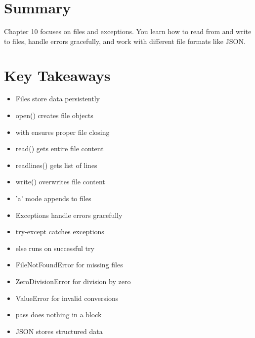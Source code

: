 \section*{Summary}
Chapter 10 focuses on files and exceptions. You learn how to read from and write to files, handle errors gracefully, and work with different file formats like JSON.

\section*{Key Takeaways}
\begin{itemize}
    \item Files store data persistently
    \item open() creates file objects
    \item with ensures proper file closing
    \item read() gets entire file content
    \item readlines() gets list of lines
    \item write() overwrites file content
    \item 'a' mode appends to files
    \item Exceptions handle errors gracefully
    \item try-except catches exceptions
    \item else runs on successful try
    \item FileNotFoundError for missing files
    \item ZeroDivisionError for division by zero
    \item ValueError for invalid conversions
    \item pass does nothing in a block
    \item JSON stores structured data
\end{itemize} 